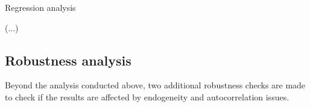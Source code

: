 \documentclass[a4paper,12pt]{article}
\begin{document}

\begin{table}
	
\end{table}

\begin{table}[ht]
\caption{Regression analysis}\label{tb:regresults}
	\begin{center}
		
	\end{center}
\end{table}


\vspace{0.5cm}
(...)
\vspace{0.5cm}




\subsection{Robustness analysis}\label{sec:robust}
Beyond the analysis conducted above, two additional robustness checks are made to check if the results are affected by endogeneity and autocorrelation issues.
\end{document}
